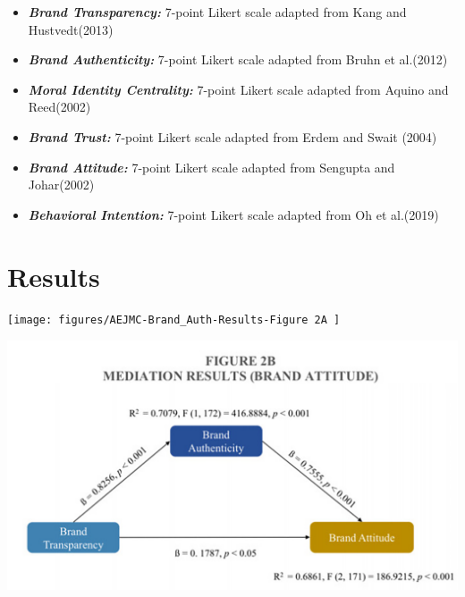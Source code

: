 \documentclass[a0,portrait]{a0poster}
\begin{document}
\begin{minipage}[c]{\linewidth}
\begin{framed}
\begin{multicols}{2}
\begin{itemize}
\begin{itemize} \item 
\textbf{\emph{Brand Transparency:}} 7-point Likert scale adapted from Kang and Hustvedt(2013)\autocite{kang_building_2013}
\end{itemize}
\begin{itemize}
    \item \textbf{\emph{Brand Authenticity:}} 7-point Likert scale adapted from Bruhn et al.(2012)\autocite{bruhn_brand_2012}
\end{itemize}
\begin{itemize} \item
\textbf{\emph{Moral Identity Centrality:}} 7-point Likert scale adapted from Aquino and Reed(2002)\autocite{aquino_self-importance_2002}
\end{itemize}
\begin{itemize} \item
\textbf{\emph{Brand Trust:}} 7-point Likert scale adapted from Erdem and Swait (2004)\autocite{Erdem_Swait_2004}
\end{itemize}
\begin{itemize} \item
\textbf{\emph{Brand Attitude:}} 7-point Likert scale adapted from Sengupta and Johar(2002)\autocite{Sengupta_Johar_2002}
\end{itemize}
\begin{itemize} \item
\textbf{\emph{Behavioral Intention:}} 7-point Likert scale adapted from Oh et al.(2019)\autocite{Oh_Prado_Korelo_Frizzo_2019}
\end{itemize}
\end{itemize}

\color{Maroon}
\section*{Results}
\color{Black}

\begin{center}
\texttt{[image: figures/AEJMC-Brand\_Auth-Results-Figure 2A ]}
\label{ALICerros}
\end{center}

\begin{center}
\includegraphics[width=0.5\linewidth]{figures/AEJMC-Brand_Auth-Results-Figure 2B}
\label{ALICerros}
\end{center}


\end{multicols}
\end{framed}
\end{minipage}
\end{document}
